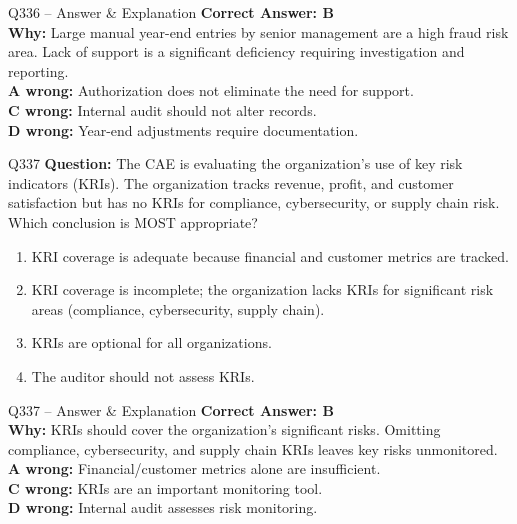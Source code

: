 \documentclass[aspectratio=169,10pt]{beamer}
\begin{document}
	\begin{frame}[t]{Q336 -- Answer \& Explanation}
		\small
		\textbf{Correct Answer: B} \\[4pt]
		\textbf{Why:} Large manual year-end entries by senior management are a high fraud risk area. Lack of support is a significant deficiency requiring investigation and reporting. \\[4pt]
		\textbf{A wrong:} Authorization does not eliminate the need for support. \\[2pt]
		\textbf{C wrong:} Internal audit should not alter records. \\[2pt]
		\textbf{D wrong:} Year-end adjustments require documentation.
	\end{frame}
	
	\begin{frame}[t]{Q337}
		\small
		\textbf{Question:} The CAE is evaluating the organization's use of key risk indicators (KRIs). The organization tracks revenue, profit, and customer satisfaction but has no KRIs for compliance, cybersecurity, or supply chain risk. Which conclusion is MOST appropriate?
		\begin{enumerate}[label=\Alph*.,itemsep=1pt,topsep=2pt]
			\item KRI coverage is adequate because financial and customer metrics are tracked.
			\item KRI coverage is incomplete; the organization lacks KRIs for significant risk areas (compliance, cybersecurity, supply chain).
			\item KRIs are optional for all organizations.
			\item The auditor should not assess KRIs.
		\end{enumerate}
	\end{frame}
	
	\begin{frame}[t]{Q337 -- Answer \& Explanation}
		\small
		\textbf{Correct Answer: B} \\[4pt]
		\textbf{Why:} KRIs should cover the organization's significant risks. Omitting compliance, cybersecurity, and supply chain KRIs leaves key risks unmonitored. \\[4pt]
		\textbf{A wrong:} Financial/customer metrics alone are insufficient. \\[2pt]
		\textbf{C wrong:} KRIs are an important monitoring tool. \\[2pt]
		\textbf{D wrong:} Internal audit assesses risk monitoring.
	\end{frame}
	
\end{document}

